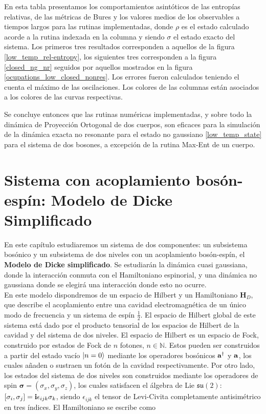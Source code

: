 \documentclass{report} %
\numberwithin{equation}{section}
\begin{document}
\begin{table}
\begin{tablenotes}
      \small
      \item En esta tabla presentamos los comportamientos asintóticos de las entropías relativas, de las métricas de Bures y los valores medios de los observables a tiempos largos para las rutinas implementadas, donde $\rho$ es el estado calculado acorde a la rutina indexada en la columna y siendo $\sigma$ el estado exacto del sistema. Los primeros tres resultados corresponden a aquellos de la figura \ref{low_temp_rel-entropy}, los siguientes tres corresponden a la figura \ref{closed_ng_nr} seguidos por aquellos mostrados en la figura \ref{ocupations_low_closed_nonres}. Los errores fueron calculados teniendo el cuenta el máximo de las oscilaciones. Los colores de las columnas están asociados a los colores de las curvas respectivas. 
    \end{tablenotes}
    \label{table4}
\end{table}

Se concluye entonces que las rutinas numéricas implementadas, y sobre todo la dinámica de Proyección Ortogonal de dos cuerpos, son eficaces para la simulación de la dinámica exacta no resonante para el estado no gaussiano \eqref{low_temp_state} para el sistema de dos bosones, a excepción de la rutina Max-Ent de un cuerpo. 

\clearpage

\section{Sistema con acoplamiento bos\'on-esp\'in: Modelo de Dicke Simplificado}

En este capítulo estudiaremos un sistema de dos componentes: un subsistema bosónico y un subsistema de dos niveles con un acoplamiento bosón-espín, el \textbf{Modelo de Dicke simplificado}. Se estudiarán la dinámica cuasi gaussiana, donde la interacción conmuta con el Hamiltoniano espinorial, y una dinámica no gaussiana donde se elegirá una interacción donde esto no ocurre. \\

En este modelo dispondremos de un espacio de Hilbert y un Hamiltoniano $\mathbf{H}_D$, que describe el acoplamiento entre una cavidad electromagnética de un único modo de frecuencia y un sistema de espín $\frac{1}{2}$. El espacio de Hilbert global de este sistema está dado por el producto tensorial de los espacios de Hilbert de la cavidad y del sistema de dos niveles. El espacio de Hilbert es un espacio de Fock, construido por estados de Fock de $n$ fotones, $n \in \mathds{N}$. Estos  pueden ser construidos a partir del estado vacío $\ket{n=0}$ mediante los operadores bosónicos ${\bf a}^{\dagger}$ y ${\bf a}$, los cuales añaden o sustraen un fotón de la cavidad respectivamente. 
Por otro lado, los estados del sistema de dos niveles son construidos mediante los operadores de spin $\boldsymbol{\sigma} = (\sigma_x,\sigma_y,\sigma_z)$, los cuales satisfacen el álgebra de Lie $\mathfrak{su(2)}$: $[\sigma_i,\sigma_j]={\bf i} \epsilon_{ijk}\sigma_k $, siendo $\epsilon_{ijk}$ el tensor de Levi-Civita completamente antisimétrico en tres índices. El Hamiltoniano se escribe como
\end{document}
